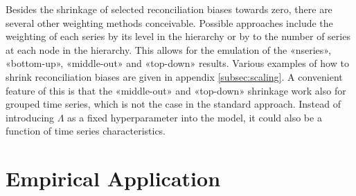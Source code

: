 \documentclass[a4paper,fleqn,11pt]{article}
\begin{document}
Besides the shrinkage of selected reconciliation biases towards zero, there are several other weighting methods conceivable.  Possible approaches include the weighting of each series by its level in the hierarchy or by to the number of series at each node in the hierarchy. This allows for the emulation of the «nseries», «bottom-up», «middle-out» and «top-down» results. Various examples of how to shrink reconciliation biases are given in appendix \ref{subsec:scaling}. A convenient feature of this is that the «middle-out» and «top-down» shrinkage work also for grouped time series, which is not the case in the standard approach. Instead of introducing $\Lambda$ as a fixed hyperparameter into the model, it could also be a function of time series characteristics.\\

\clearpage


\section{Empirical Application}
\label{sec:appl}
\end{document}
